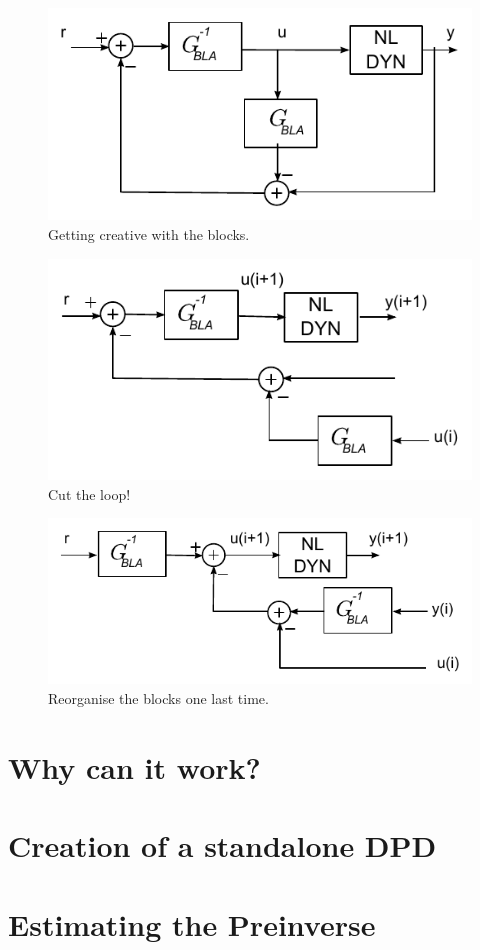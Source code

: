 		\begin{figure}[hbtp]
			\centering
			\includegraphics{images/lego4}
			\caption{Getting creative with the blocks. }
		\end{figure}

		\begin{figure}[hbtp]
			\centering
			\includegraphics{images/lego5}
			\caption{Cut the loop! }
		\end{figure}

		\begin{figure}[hbtp]
			\includegraphics{images/lego6}
			\caption{Reorganise the blocks one last time. }
		\end{figure}

\section{Why can it work?}
\section{Creation of a standalone DPD}
\section{Estimating the Preinverse}